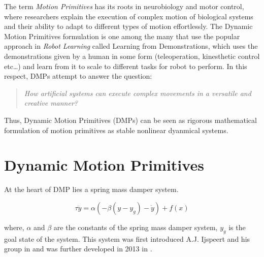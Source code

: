 The term \textit{Motion Primitives} has its roots in neurobiology and motor control, where researchers
explain the execution of complex motion of biological systems and their ability to adapt to different types of motion effortlessly.
The Dynamic Motion Primitives formulation is one among the many that use the popular approach in \textit{Robot Learning} called Learning from Demonstrations, which uses the demonstrations given by a 
human in some form (teleoperation, kinesthetic control etc\dots) and learn from it to scale to different tasks for robot to perform.
In this respect, DMPs attempt to answer the question:

\begin{quote}
    \centering
    \textit{How artificial systems can execute
complex movements in a versatile and creative manner?\cite{saveriano2021dynamic}}
\end{quote}

Thus, Dynamic Motion Primitives (DMPs) can be seen as rigorous mathematical formulation of motion primitives as stable nonlinear dyanmical systems.

\section{Dynamic Motion Primitives}

At the heart of DMP lies a spring mass damper system.

\begin{equation}
    \tau \ddot{y} = \alpha \left( -\beta \left( y - y_g \right) - \dot{y} \right) + f(x)
    \label{eq:dmp_equation}
\end{equation}

where, $\alpha$ and $\beta$ are the constants of the spring mass damper system, $y_g$ is the goal state of the system.
This system was first introduced A.J. Ijspeert and his group in \cite{Ijspeert2002} and was further developed in 2013 in \cite{Ijspeert2013}.



